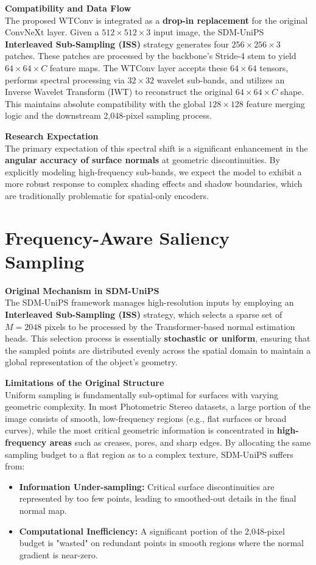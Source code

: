 \documentclass[Main.tex]{subfiles}
\begin{document}
\textbf{Compatibility and Data Flow} \\
The proposed WTConv is integrated as a \textbf{drop-in replacement} for the original ConvNeXt layer. Given a $512 \times 512 \times 3$ input image, the SDM-UniPS \textbf{Interleaved Sub-Sampling (ISS)} strategy generates four $256 \times 256 \times 3$ patches. These patches are processed by the backbone's Stride-4 stem to yield $64 \times 64 \times C$ feature maps. The WTConv layer accepts these $64 \times 64$ tensors, performs spectral processing via $32 \times 32$ wavelet sub-bands, and utilizes an Inverse Wavelet Transform (IWT) to reconstruct the original $64 \times 64 \times C$ shape. This maintains absolute compatibility with the global $128 \times 128$ feature merging logic and the downstream 2,048-pixel sampling process.

\textbf{Research Expectation} \\
The primary expectation of this spectral shift is a significant enhancement in the \textbf{angular accuracy of surface normals} at geometric discontinuities. By explicitly modeling high-frequency sub-bands, we expect the model to exhibit a more robust response to complex shading effects and shadow boundaries, which are traditionally problematic for spatial-only encoders.

\section{Frequency-Aware Saliency Sampling}
\textbf{Original Mechanism in SDM-UniPS} \\
The SDM-UniPS framework manages high-resolution inputs by employing an \textbf{Interleaved Sub-Sampling (ISS)} strategy, which selects a sparse set of $M=2048$ pixels to be processed by the Transformer-based normal estimation heads. This selection process is essentially \textbf{stochastic or uniform}, ensuring that the sampled points are distributed evenly across the spatial domain to maintain a global representation of the object's geometry.

\textbf{Limitations of the Original Structure} \\
Uniform sampling is fundamentally sub-optimal for surfaces with varying geometric complexity. In most Photometric Stereo datasets, a large portion of the image consists of smooth, low-frequency regions (e.g., flat surfaces or broad curves), while the most critical geometric information is concentrated in \textbf{high-frequency areas} such as creases, pores, and sharp edges. By allocating the same sampling budget to a flat region as to a complex texture, SDM-UniPS suffers from:
\begin{itemize}
    \item \textbf{Information Under-sampling:} Critical surface discontinuities are represented by too few points, leading to smoothed-out details in the final normal map.
    \item \textbf{Computational Inefficiency:} A significant portion of the 2,048-pixel budget is "wasted" on redundant points in smooth regions where the normal gradient is near-zero.
\end{itemize}
\end{document}
